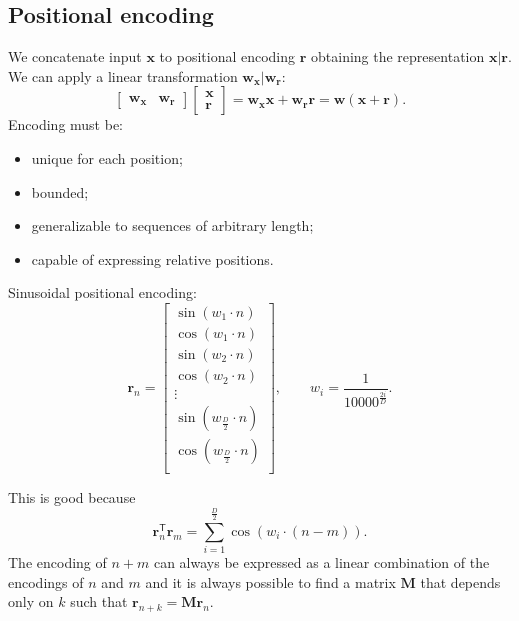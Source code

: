 \documentclass[a4paper,9pt]{extarticle}
\begin{document}
\begin{multicols*}{2}
		\subsection{Positional encoding}
		We concatenate input $\mathbf{x}$ to positional encoding $\mathbf{r}$ obtaining the representation $\mathbf{x|r}$. We can apply a linear transformation $\mathbf{w_{x}|w_{r}}$:
		\begin{equation*}
			\mathbf{\begin{bmatrix}
					\mathbf{w_{x}} &\mathbf{w_{r} }
			\end{bmatrix}}\begin{bmatrix}
			\mathbf{x}\\
			\mathbf{r}
		\end{bmatrix}=\mathbf{w_{x}x+w_{r}r=w(x+r)}.
		\end{equation*}
		Encoding must be:
		\begin{itemize}
			\item unique for each position;
			\item bounded;
			\item generalizable to sequences of arbitrary length;
			\item capable of expressing relative positions.
		\end{itemize}
		\begin{riquadro}
			Sinusoidal positional encoding:
			\begin{equation*}
				\mathbf{r}_{n}=\begin{bmatrix}
					\sin(w_{1}\cdot n)\\
					\cos(w_{1}\cdot n)\\
					\sin(w_{2}\cdot n)\\
					\cos(w_{2}\cdot n)\\
					\vdots\\
					\sin(w_{\frac{D}{2}}\cdot n)\\
					\cos(w_{\frac{D}{2}}\cdot n)\\
				\end{bmatrix},\qquad w_{i}=\frac{1}{10000^{\frac{2i}{D}}}.
			\end{equation*}
		\end{riquadro}
		This is good because 
		\begin{equation*}
			\mathbf{r}_{n}^{\mathsf{T}}\mathbf{r}_{m}=\sum_{i=1}^{\frac{D}{2}}\cos(w_{i}\cdot(n-m)).
		\end{equation*}
		The encoding of $n+m$ can always be expressed as a linear combination of the encodings of $n$ and $m$ and it is always possible to find a matrix $\mathbf{M}$ that depends only on $k$ such that $\mathbf{r}_{n+k}=\mathbf{Mr}_{n}$.

\end{multicols*}
\end{document}
